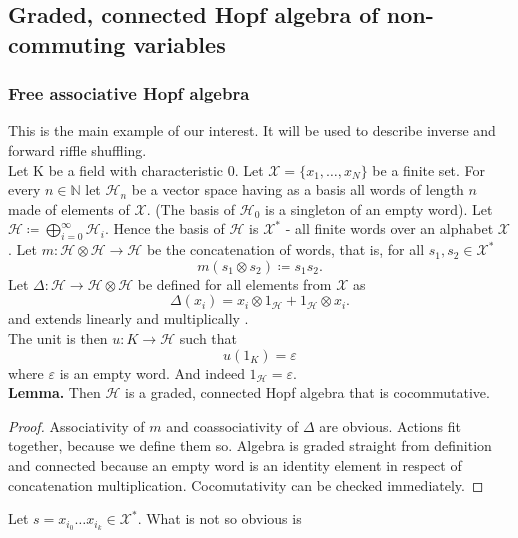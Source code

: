 \documentclass[a4paper, 12pt]{article}
\begin{document}
\subsection{Graded, connected Hopf algebra of non-commuting variables}\label{gcha}
\subsubsection{Free associative Hopf algebra}
This is the main example of our interest. It will be used to describe inverse and forward riffle shuffling.\\
Let K be a field with characteristic 0.
Let $\mathcal{X} = \{x_1, \dots, x_N\}$ be a finite set. For every $n \in \mathbb{N}$ let
$\mathcal{H}_n$ be a vector space having as a basis all words of length $n$ made of elements
of $\mathcal{X}$. (The basis of $\mathcal{H}_0$ is a singleton of an empty word).
Let $\mathcal{H} \coloneqq \displaystyle\bigoplus^{\infty}_{i = 0} \mathcal{H}_i$. Hence
the basis of $\mathcal{H}$ is $\mathcal{X}^*$ - all finite words over an alphabet $\mathcal{X}$.
Let $m : \mathcal{H} \otimes \mathcal{H} \to \mathcal{H}$ be the concatenation of words,
that is, for all $s_1, s_2 \in \mathcal{X}^*$
\begin{equation*}
m(s_1 \otimes s_2) \coloneqq s_1s_2.
\end{equation*}
Let $\Delta : \mathcal{H} \to \mathcal{H} \otimes \mathcal{H}$ be defined for all elements from
$\mathcal{X}$ as
\begin{equation*}
\Delta(x_i) = x_i \otimes 1_\mathcal{H} + 1_\mathcal{H} \otimes x_i.
\end{equation*}
and extends linearly and multiplically .\\
The unit is then $u : K \to \mathcal{H}$ such that
\begin{equation*}
u(1_K) = \varepsilon
\end{equation*}
where $\varepsilon$ is an empty word. And indeed $1_\mathcal{H} = \varepsilon$. \\
\textbf{Lemma. } Then $\mathcal{H}$ is a graded, connected Hopf algebra that is cocommutative.
\begin{proof}
Associativity of $m$ and coassociativity of $\Delta$ are obvious. Actions fit together,
because we define them so. Algebra is graded straight from definition and connected because an empty word
is an identity element in respect of concatenation multiplication. Cocomutativity can be checked immediately.
\end{proof}
\noindent Let $s = x_{i_0}\dots x_{i_k} \in \mathcal{X}^*$. What is not so obvious is
\end{document}

